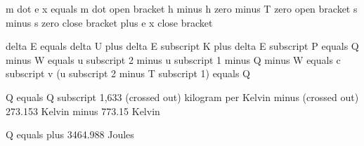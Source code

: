 m dot e x equals m dot open bracket h minus h zero minus T zero open bracket s minus s zero close bracket plus e x close bracket

delta E equals delta U plus delta E subscript K plus delta E subscript P equals Q minus W  
equals u subscript 2 minus u subscript 1 minus Q minus W  
equals c subscript v (u subscript 2 minus T subscript 1) equals Q  

Q equals Q subscript 1,633 (crossed out) kilogram per Kelvin minus (crossed out) 273.153 Kelvin minus 773.15 Kelvin  

Q equals plus 3464.988 Joules